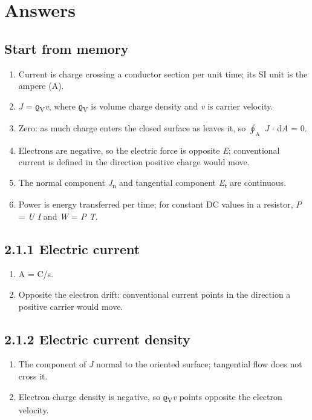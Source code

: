 \documentclass[11pt]{article}
\begin{document}
\clearpage
\section{Answers}
\begin{keepsection}\subsection{Start from memory}

\begin{enumerate}
\item Current is charge crossing a conductor section per unit time; its SI unit is the ampere (A).
\item \textit{J} = ϱ\textsubscript{V}\textit{v}, where ϱ\textsubscript{V} is volume charge density and \textit{v} is carrier velocity.
\item Zero: as much charge enters the closed surface as leaves it, so $\oint_{\mathrm{A}} $ \textit{J} \ensuremath{\cdot} d\textit{A} = 0.
\item Electrons are negative, so the electric force is opposite \textit{E}; conventional current is defined in the direction positive charge would move.
\item The normal component \textit{J}\textsubscript{n} and tangential component \textit{E}\textsubscript{t} are continuous.
\item Power is energy transferred per time; for constant DC values in a resistor, \textit{P} = \textit{U I} and \textit{W} = \textit{P T}.
\end{enumerate}

\end{keepsection}
\begin{keepsection}\subsection{2.1.1 Electric current}

\begin{enumerate}
\item A = C/s.
\item Opposite the electron drift: conventional current points in the direction a positive carrier would move.
\end{enumerate}

\end{keepsection}
\begin{keepsection}\subsection{2.1.2 Electric current density}

\begin{enumerate}
\item The component of \textit{J} normal to the oriented surface; tangential flow does not cross it.
\item Electron charge density is negative, so ϱ\textsubscript{V}\textit{v} points opposite the electron velocity.
\end{enumerate}

\end{keepsection}
\end{document}
